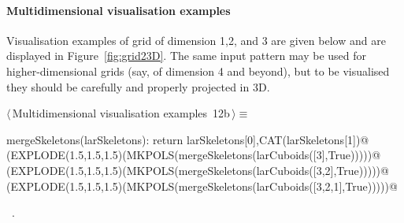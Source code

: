 \documentclass[11pt,oneside]{article}	%
\begin{document}
\paragraph{Multidimensional visualisation examples}
Visualisation examples of grid of dimension 1,2, and 3 are given below and are displayed  in Figure~\ref{fig:grid23D}. The same input pattern may be used for higher-dimensional grids (say, of dimension 4 and beyond), but to be visualised they should be carefully and properly projected in 3D.

\begin{flushleft} \small
\begin{minipage}{\linewidth} \label{scrap17}
\protect{}$\langle\,$Multidimensional visualisation examples\nobreak\ {\footnotesize 12b}$\,\rangle\equiv$
\vspace{-1ex}
\begin{list}{}{} \item
\mbox{}\verb@def mergeSkeletons(larSkeletons): return larSkeletons[0],CAT(larSkeletons[1])@\\
\mbox{}\verb@VIEW(EXPLODE(1.5,1.5,1.5)(MKPOLS(mergeSkeletons(larCuboids([3],True)))))@\\
\mbox{}\verb@VIEW(EXPLODE(1.5,1.5,1.5)(MKPOLS(mergeSkeletons(larCuboids([3,2],True)))))@\\
\mbox{}\verb@VIEW(EXPLODE(1.5,1.5,1.5)(MKPOLS(mergeSkeletons(larCuboids([3,2,1],True)))))@\\
\mbox{}\verb@@{\NWsep}
\end{list}
\vspace{-1ex}
\footnotesize\addtolength{\baselineskip}{-1ex}
\begin{list}{}{\setlength{\itemsep}{-\parsep}\setlength{\itemindent}{-\leftmargin}}
\item \NWtxtMacroRefIn\ .
\end{list}
\end{minipage}\\[4ex]
\end{flushleft}
\end{document}
